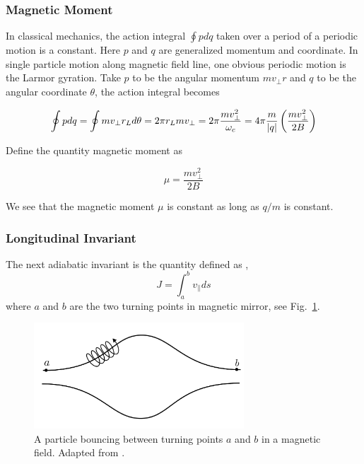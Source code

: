 \subsubsection*{Magnetic Moment}
In classical mechanics, the action integral $\oint pdq$ taken over a period of a periodic motion is a constant. Here $p$ and $q$ are generalized momentum and coordinate. In single particle motion along magnetic field line, one obvious periodic motion is the Larmor gyration. Take $p$ to be the angular momentum $mv_\perp r$ and $q$ to be the angular coordinate $\theta$, the action integral becomes

\begin{equation}
	\oint pdq = \oint mv_\perp r_L d\theta = 2\pi r_L mv_\perp = 2\pi \frac{mv_\perp^2}{\omega_c} = 4\pi\frac{m}{\abs{q}}\left(\frac{mv_\perp^2}{2B}\right)
\end{equation}

Define the quantity magnetic moment as

\begin{equation}
	\mu = \frac{mv_\perp^2}{2B}
\end{equation}

We see that the magnetic moment $\mu$ is constant as long as $q/m$ is constant.

\subsubsection*{Longitudinal Invariant}
The next adiabatic invariant is the quantity defined as \cite{chen_introduction_2016},
\begin{equation}
	J=\int_a^b v_\parallel ds
\end{equation}
where $a$ and $b$ are the two turning points in magnetic mirror, see Fig.~\ref{fig:particle-in-mirror}.

\begin{figure}[htbp]
	\centering
	\includegraphics[width=0.7\textwidth]{figures/particle-in-mirror.png}
	\caption{A particle bouncing between turning points $a$ and $b$ in a magnetic field. Adapted from \cite{chen_introduction_2016}.}
	\label{fig:particle-in-mirror}
\end{figure}

